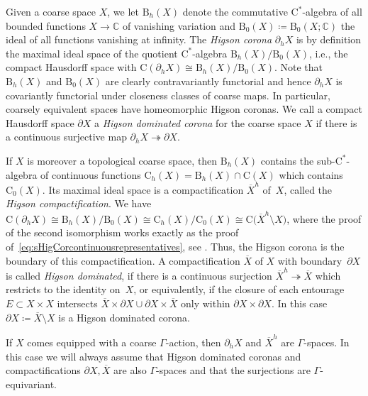 \documentclass[pdftex]{sigma}
\numberwithin{equation}{section}
\theoremstyle{definition}
\newcommand{\C}{\mathbb{C}}
\newcommand{\Ct}{\mathrm{C}}
\newcommand{\Cz}{\Ct_0}
\newcommand{\Ch}{\Ct_h}
\newcommand{\textCstar}{\ensuremath{\mathrm{C}^*\!}}
\newcommand{\VanInfFuAlg}{\mathrm{B}_0}
\newcommand{\HigFuAlg}{\mathrm{B}_h}
\begin{document}
Given a coarse space $X$, we let $\HigFuAlg(X)$ denote the commutative \textCstar-algebra of all bounded functions $X\to\C$ of vanishing variation and $\VanInfFuAlg(X)\coloneqq \VanInfFuAlg(X;\C)$ the ideal of all functions vanishing at infinity. The \emph{Higson corona} $\partial_hX$ is by definition the maximal ideal space of the quotient \textCstar-algebra $\HigFuAlg(X)/\VanInfFuAlg(X)$, i.e., the compact Hausdorff space with $\Ct(\partial_hX)\cong \HigFuAlg(X)/\VanInfFuAlg(X)$.
Note that $\HigFuAlg(X)$ and $\VanInfFuAlg(X)$ are clearly contravariantly functorial and hence $\partial_hX$ is covariantly functorial under closeness classes of coarse maps.
In particular, coarsely equivalent spaces have homeomorphic Higson coronas.
We call a compact Hausdorff space $\partial X$ a \emph{Higson dominated corona} for the coarse space $X$ if there is a continuous surjective map $\partial_hX\twoheadrightarrow \partial X$.

If $X$ is moreover a topological coarse space, then $\HigFuAlg(X)$ contains the sub-\textCstar-algebra of continuous functions $\Ch(X)=\HigFuAlg(X)\cap\Ct(X)$ which contains $\Cz(X)$. Its maximal ideal space is a compactification $\overline{X}^h$ of~$X$, called the \emph{Higson compactification}. We have $\Ct(\partial_hX)\cong \HigFuAlg(X)/\VanInfFuAlg(X)\cong \Ch(X)/\Cz(X)\cong \Ct\big(\overline{X}^h\setminus X\big)$, where the proof of the second isomorphism works exactly as the proof of~\eqref{eq:sHigCorcontinuousrepresentatives}, see \cite[proof of Proposition~3.7]{EmeMeyDualizing}.
Thus, the Higson corona is the boundary of this compactification. A compactification $\overline{X}$ of $X$ with boundary~$\partial X$ is called \emph{Higson dominated}, if there is a continuous surjection $\overline{X}^h\twoheadrightarrow\overline{X}$ which restricts to the identity on~$X$, or equivalently, if the closure of each entourage $E\subset X\times X$ intersects $\overline{X}\times\partial X\cup\partial X\times\overline{X}$ only within $\partial X\times\partial X$.
In this case $\partial X\coloneqq \overline{X}\setminus X$ is a Higson dominated corona.


If $X$ comes equipped with a coarse $\Gamma$-action, then $\partial_h X$ and $\overline{X}^h$ are $\Gamma$-spaces. In this case we will always assume that Higson dominated coronas and compactifications $\partial X,\overline{X}$ are also $\Gamma$-spaces and that the surjections are $\Gamma$-equivariant.
\end{document}
